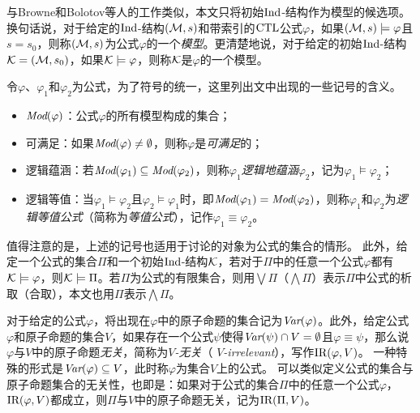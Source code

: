 与Browne和Bolotov等人的工作类似，本文只将初始$\textrm{Ind}$-结构作为模型的候选项\cite{browne1988characterizing,DBLP:journals/jetai/BolotovF99}。换句话说，对于给定的$\textrm{Ind}$-结构$({\cal M},s)$和带索引的$\textrm{CTL}$公式$\varphi$，如果$({\cal M},s)\models \varphi$且$s = s_0$，则称$({\cal M},s)$为公式$\varphi$的一个\emph{模型}。更清楚地说，对于给定的初始$\textrm{Ind}$-结构${\cal K}=({\cal M},s_0)$，如果${\cal K} \models \varphi$，则称$\cal K$是$\varphi$的一个模型。


令$\varphi$、$\varphi_1$和$\varphi_2$为公式，为了符号的统一，这里列出文中出现的一些记号的含义。
\begin{itemize}
	\item $\textit{Mod}(\varphi)$：公式$\varphi$的所有模型构成的集合；
	\item 可满足：如果$\textit{Mod}(\varphi)\not = \emptyset$，则称$\varphi$是\emph{可满足}的；
	\item 逻辑蕴涵：若$\textit{Mod}(\varphi_1)\subseteq \textit{Mod}(\varphi_2)$，则称$\varphi_1$\emph{逻辑地蕴涵}$\varphi_2$，记为$\varphi_1\models \varphi_2$；
	\item 逻辑等值：当$\varphi_1\models \varphi_2$且$\varphi_2\models \varphi_1$时，即$\textit{Mod}(\varphi_1)= \textit{Mod}(\varphi_2)$，则称$\varphi_1$和$\varphi_2$为\emph{逻辑等值公式}（简称为\emph{等值公式}），记作$\varphi_1 \equiv \varphi_2$。
\end{itemize}


值得注意的是，上述的记号也适用于讨论的对象为公式的集合的情形。
此外，给定一个公式的集合$\Pi$和一个初始$\textrm{Ind}$-结构$\cal K$，若对于$\Pi$中的任意一个公式$\varphi$都有${\cal K} \models \varphi$，则${\cal K} \models \Pi$。若$\Pi$为公式的有限集合，则用$\bigvee \Pi$（$\bigwedge \Pi$）表示$\Pi$中公式的析取（合取），本文也用$\Pi$表示$\bigwedge \Pi$。

对于给定的公式$\varphi$，将出现在$\varphi$中的原子命题的集合记为$\textit{Var}(\varphi)$。此外，给定公式$\varphi$和原子命题的集合$V$，如果存在一个公式$\psi$使得$\textit{Var}(\psi) \cap V = \emptyset$且$\varphi \equiv \psi$，那么说$\varphi$与$V$中的原子命题\emph{无关}，简称为\emph{$V$-无关}（ \emph{$V$-irrelevant}），写作$\textrm{IR}(\varphi,V)$。
一种特殊的形式是$\textit{Var}(\varphi) \subseteq V$，此时称$\varphi$为集合$V$上的公式。
可以类似定义公式的集合与原子命题集合的无关性，也即是：如果对于公式的集合$\Pi$中的任意一个公式$\varphi$，$\textrm{IR}(\varphi,V)$都成立，则$\Pi$与$V$中的原子命题无关，记为$\textrm{IR}(\Pi,V)$。

